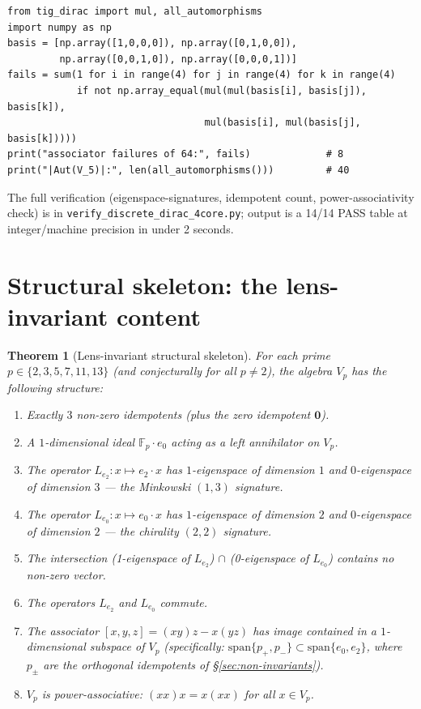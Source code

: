 \documentclass[11pt,reqno]{amsart}
\theoremstyle{plain}
\newtheorem{theorem}{Theorem}[section]
\theoremstyle{definition}
\theoremstyle{remark}
\newcommand{\F}{\mathbb{F}}
\begin{document}
\begin{lstlisting}[style=plainpy]
from tig_dirac import mul, all_automorphisms
import numpy as np
basis = [np.array([1,0,0,0]), np.array([0,1,0,0]),
         np.array([0,0,1,0]), np.array([0,0,0,1])]
fails = sum(1 for i in range(4) for j in range(4) for k in range(4)
            if not np.array_equal(mul(mul(basis[i], basis[j]), basis[k]),
                                  mul(basis[i], mul(basis[j], basis[k]))))
print("associator failures of 64:", fails)             # 8
print("|Aut(V_5)|:", len(all_automorphisms()))         # 40
\end{lstlisting}

The full verification (eigenspace-signatures, idempotent count,
power-associativity check) is in
\texttt{verify\_discrete\_dirac\_4core.py}; output is a 14/14 PASS
table at integer/machine precision in under 2 seconds.

\section{Structural skeleton: the lens-invariant content}

\begin{theorem}[Lens-invariant structural skeleton]
\label{thm:invariants}
For each prime $p \in \{2, 3, 5, 7, 11, 13\}$ (and conjecturally for
all $p \neq 2$), the algebra $V_p$ has the following structure:
\begin{enumerate}[leftmargin=2.5em]
\item Exactly $3$ non-zero idempotents (plus the zero idempotent $\mathbf{0}$).
\item A $1$-dimensional ideal $\F_p \cdot e_0$ acting as a left
annihilator on $V_p$.
\item The operator $L_{e_2}: x \mapsto e_2 \cdot x$ has $1$-eigenspace
of dimension $1$ and $0$-eigenspace of dimension $3$ — the
\emph{Minkowski $(1, 3)$ signature}.
\item The operator $L_{e_0}: x \mapsto e_0 \cdot x$ has $1$-eigenspace
of dimension $2$ and $0$-eigenspace of dimension $2$ — the
\emph{chirality $(2, 2)$ signature}.
\item The intersection (1-eigenspace of $L_{e_2}$) $\cap$
(0-eigenspace of $L_{e_0}$) contains no non-zero vector.
\item The operators $L_{e_2}$ and $L_{e_0}$ commute.
\item The associator $[x, y, z] = (x y) z - x (y z)$ has image
contained in a $1$-dimensional subspace of $V_p$ (specifically:
$\mathrm{span}\{p_+, p_-\} \subset \mathrm{span}\{e_0, e_2\}$, where
$p_\pm$ are the orthogonal idempotents of §\ref{sec:non-invariants}).
\item $V_p$ is power-associative: $(x x) x = x (x x)$ for all $x \in V_p$.
\end{enumerate}
\end{theorem}
\end{document}
